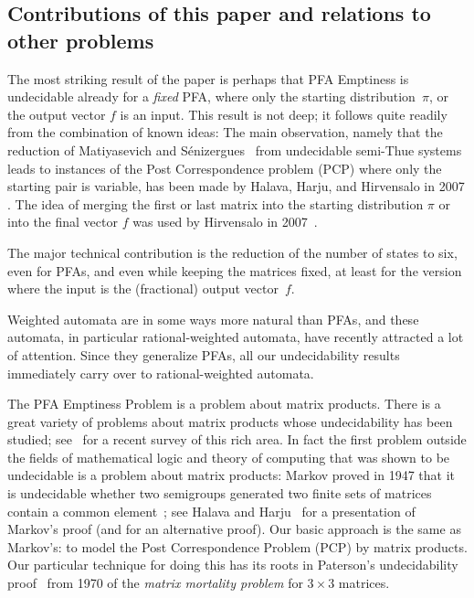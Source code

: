 \documentclass[a4paper,cleveref, autoref, thm-restate]{lipics-v2021}
\newif\ifnotkurz
\begin{document}
\subsection{Contributions of this paper and relations to other problems}
\label{sec:contributions}
The most striking result of the paper is perhaps that
PFA Emptiness is  undecidable already for a \emph{fixed} PFA,
where only the starting distribution~$\pi$, or the output vector $f$
is an input.
This result is not deep; it follows quite readily from the combination of known
ideas:
The main observation, namely that the
reduction of
 Matiyasevich and Sénizergues~\cite{matiyasevich2005decision}
 from undecidable semi-Thue systems leads to instances of
 the Post Correspondence problem (PCP) where only the starting pair is variable,
 has been made by Halava, Harju, and Hirvensalo in 2007
 \cite[Theorem~6]
 {halava07-Claus-instances}.
The idea of merging the first or last matrix into the starting
distribution $\pi$
or into the final vector $f$ was used by Hirvensalo in
2007~\cite[Step~2 in Section~3]{hirvensalo07}.

The major technical contribution is the reduction of the number of
states to six, even for PFAs, and even while keeping the matrices
fixed,
at least for the version where the input is the (fractional) output vector~$f$.

\ifnotkurz
Weighted automata
are in some ways more natural than PFAs, and these
automata, in particular rational-weighted automata,
have recently attracted a lot of attention.
Since they generalize PFAs, all our 
undecidability results immediately carry over to rational-weighted
automata.

The PFA Emptiness Problem is a problem about matrix products.
There is a great variety of problems about matrix products
whose undecidability has been studied;
see~\cite{Advances-Semigroups-2023} for a recent survey of this rich
area.
In fact the first problem
outside
the %
fields of
mathematical logic and %
theory of computing
 that was shown to be undecidable is
a problem about matrix products:
Markov proved in 1947
that it is undecidable whether two semigroups
generated two finite sets of matrices contain
a common element~\cite{Markov-1947};
see Halava and
Harju~\cite{halava-harju-07_markov_undec_theor_integ_matric}
for a presentation of Markov's proof (and for an alternative proof).
Our basic approach is the same as Markov's: to model
the Post Correspondence Problem (PCP) by matrix products.
Our particular technique for doing this has its
roots in
 Paterson's undecidability proof~\cite{paterson70}
from 1970
of the \emph{matrix mortality problem} for $3\times 3$
 matrices. %
\end{document}
